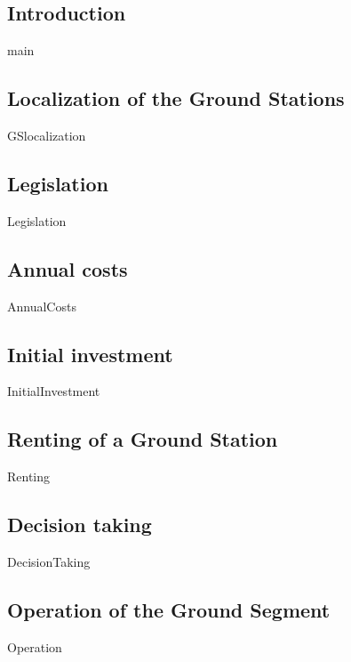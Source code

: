 \subsection{Introduction}
{main}

\subsection{Localization of the Ground Stations}
{GSlocalization}

\subsection{Legislation}
{Legislation}

\subsection{Annual costs}
{AnnualCosts}

\subsection{Initial investment}
{InitialInvestment}

\subsection{Renting of a Ground Station}
{Renting}

\subsection{Decision taking}
{DecisionTaking}

\subsection{Operation of the Ground Segment}
{Operation}